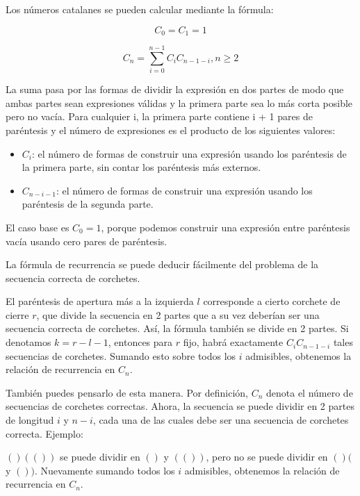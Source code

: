 Los números catalanes se pueden calcular mediante la fórmula:

$$C_0 = C_1 = 1$$

$$C_n = \sum_{i = 0}^{n-1} C_i C_{n-1-i} , {n} \geq 2$$

La suma pasa por las formas de dividir la expresión en dos partes de modo que ambas partes sean expresiones válidas y la primera parte sea lo más corta posible pero no vacía. Para cualquier i, la primera parte contiene i + 1 pares de paréntesis y el número de expresiones es el producto de los siguientes valores:

\begin{itemize}
	\item $C_i$: el número de formas de construir una expresión usando los paréntesis de la primera parte, sin contar los paréntesis más externos.
	\item $C_{n-i-1}$: el número de formas de construir una expresión usando los paréntesis de la segunda parte.
\end{itemize}

El caso base es $C_0 = 1$, porque podemos construir una expresión entre paréntesis vacía usando cero pares de paréntesis.

La fórmula de recurrencia se puede deducir fácilmente del problema de la secuencia correcta de corchetes.

El paréntesis de apertura más a la izquierda $l$ corresponde a cierto corchete de cierre $r$, que 
divide la secuencia en 2 partes que a su vez deberían ser una secuencia correcta de corchetes. 
Así, la fórmula también se divide en 2 partes. Si denotamos $k = {r - l - 1}$, entonces para $r$ 
fijo, habrá exactamente $C_i C_{n-1-i}$ tales secuencias de corchetes. Sumando esto sobre todos 
los $i$ admisibles, obtenemos la relación de recurrencia en $C_n$.

También puedes pensarlo de esta manera. Por definición, $C_n$ denota el número de secuencias de 
corchetes correctas. Ahora, la secuencia se puede dividir en 2 partes de longitud $i$ y ${n-i}$, cada una de las cuales debe ser una secuencia de corchetes correcta. Ejemplo:

$()(())$ se puede dividir en $()$ y $(())$, pero no se puede dividir en $()($ y $())$. Nuevamente 
sumando todos los $i$ admisibles, obtenemos la relación de recurrencia en $C_n$.